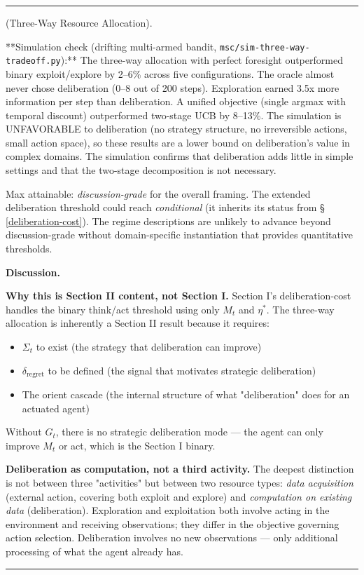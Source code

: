 \documentclass[11pt,oneside]{article}
\newcounter{claim}[section]
\renewcommand{\theclaim}{\thesection.\arabic{claim}}
\newenvironment{segment}[2]{%
  \refstepcounter{claim}%
  \bigskip\noindent\hrule\smallskip
  \noindent{\bfseries #1~\theclaim}\enskip(#2).\par\smallskip
  \noindent\ignorespaces
}{%
  \par\smallskip\noindent\hrule\bigskip
}
\newenvironment{discussion}[1][]{\begin{segment}{Discussion}{#1}}{\end{segment}}
\begin{document}
\begin{discussion}[Three-Way Resource Allocation]
**Simulation check (drifting multi-armed bandit, \texttt{msc/sim-three-way-tradeoff.py}):** The three-way allocation with perfect foresight outperformed binary exploit/explore by 2--6\% across five configurations. The oracle almost never chose deliberation (0--8 out of 200 steps). Exploration earned 3.5x more information per step than deliberation. A unified objective (single argmax with temporal discount) outperformed two-stage UCB by 8--13\%. The simulation is UNFAVORABLE to deliberation (no strategy structure, no irreversible actions, small action space), so these results are a lower bound on deliberation's value in complex domains. The simulation confirms that deliberation adds little in simple settings and that the two-stage decomposition is not necessary.

Max attainable: \textit{discussion-grade} for the overall framing. The extended deliberation threshold could reach \textit{conditional} (it inherits its status from \S\,\ref{deliberation-cost}). The regime descriptions are unlikely to advance beyond discussion-grade without domain-specific instantiation that provides quantitative thresholds.


\medskip\noindent\textbf{Discussion.}


\textbf{Why this is Section II content, not Section I.} Section I's deliberation-cost handles the binary think/act threshold using only $M_t$ and $\eta^*$. The three-way allocation is inherently a Section II result because it requires:
\begin{itemize}
  \item $\Sigma_t$ to exist (the strategy that deliberation can improve)
  \item $\delta_{\text{regret}}$ to be defined (the signal that motivates strategic deliberation)
  \item The orient cascade (the internal structure of what "deliberation" does for an actuated agent)
\end{itemize}


Without $G_t$, there is no strategic deliberation mode --- the agent can only improve $M_t$ or act, which is the Section I binary.

\textbf{Deliberation as computation, not a third activity.} The deepest distinction is not between three "activities" but between two resource types: \textit{data acquisition} (external action, covering both exploit and explore) and \textit{computation on existing data} (deliberation). Exploration and exploitation both involve acting in the environment and receiving observations; they differ in the objective governing action selection. Deliberation involves no new observations --- only additional processing of what the agent already has.


\end{discussion}
\end{document}
